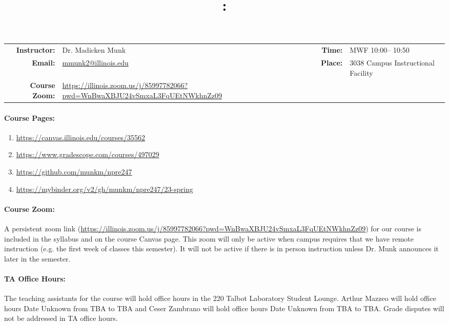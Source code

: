 \documentclass[11pt, a4paper]{article}
\title{\CourseNumber: \CourseTitle\\}
\author{\CourseUniversity}
\date{\CourseSemester \CourseYear}
\makeatletter
\newcommand{\CourseInstructor}{Dr. Madicken Munk\xspace}%
\newcommand{\CourseDays}{MWF\xspace}%
\newcommand{\CourseStart}{10:00\xspace}%
\newcommand{\CourseEnd}{10:50\xspace}%
\newcommand{\CourseInstructorEmail}{mmunk2@illinois.edu}
\newcommand{\CourseRoom}{3038\xspace}%
\newcommand{\CourseBuilding}{Campus Instructional Facility\xspace}%
\newcommand{\CourseZoom}{https://illinois.zoom.us/j/85997782066?pwd=WnBwaXBJU24vSmxaL3FqUEtNWkhnZz09}%
\newcommand{\TeachingAssistanta}{Arthur Mazzeo \xspace}%
\newcommand{\TAaOfficeHourDays}{Date Unknown \xspace}%
\newcommand{\TAaOfficeHourStart}{TBA\xspace}%
\newcommand{\TAaOfficeHourEnd}{TBA\xspace}%
\newcommand{\TAaOfficeHourPlace}{the 220 Talbot Laboratory Student Lounge\xspace}
\newcommand{\TeachingAssistantb}{Ceser Zambrano \xspace}%
\newcommand{\TAbOfficeHourDays}{Date Unknown \xspace}%
\newcommand{\TAbOfficeHourStart}{TBA\xspace}%
\newcommand{\TAbOfficeHourEnd}{TBA\xspace}%
\makeatother
\begin{document}
\maketitle
\renewcommand{\arraystretch}{1.5}
\begin{center}
\begin{table}[h]
\begin{tabularx}{\textwidth}{rXrX}
\hline
\textbf{Instructor:} & \CourseInstructor & \textbf{Time:} & \CourseDays \CourseStart -- \CourseEnd \\
\textbf{Email:} &  \href{mailto:\CourseInstructorEmail}{\CourseInstructorEmail} & \textbf{Place:} & \CourseRoom \CourseBuilding\\
\textbf{Course Zoom:} & \url{\CourseZoom} & & \\
\hline
\end{tabularx}
\end{table}
\end{center}

\paragraph{Course Pages:}
\begin{enumerate}
        \item \url{https://canvas.illinois.edu/courses/35562}
        \item \url{https://www.gradescope.com/courses/497029}
        \item \url{https://github.com/munkm/npre247}
        \item \url{https://mybinder.org/v2/gh/munkm/npre247/23-spring}
\end{enumerate}

\paragraph{Course Zoom:} A persistent zoom link (\url{\CourseZoom})
for our course is included in
the syllabus and on the course Canvas page.
This zoom will only be active when campus
requires that we have remote instruction (e.g. the first week of classes this
semester). It will not be active if there is in person instruction unless Dr.
Munk announces it later in the semester.

\paragraph{TA Office Hours:} The teaching assistants for the course will hold
office hours in \TAaOfficeHourPlace.
\TeachingAssistanta will hold office hours \TAaOfficeHourDays from
\TAaOfficeHourStart to \TAaOfficeHourEnd and
\TeachingAssistantb will hold office hours \TAbOfficeHourDays from
\TAbOfficeHourStart to \TAbOfficeHourEnd.
Grade disputes will not be addressed in TA office hours.
\end{document}
